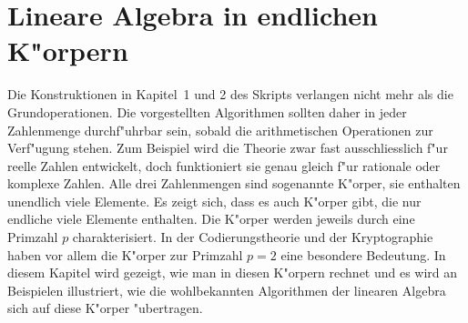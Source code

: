 %
%
%
\chapter{Lineare Algebra in endlichen K"orpern
\label{chapter:endlichekoerper}}

Die Konstruktionen in Kapitel~1 und 2 des Skripts verlangen nicht mehr
als die Grundoperationen.
Die vorgestellten Algorithmen sollten daher in jeder Zahlenmenge
durchf"uhrbar sein, sobald die arithmetischen Operationen zur
Verf"ugung stehen.
Zum Beispiel wird die Theorie zwar fast ausschliesslich f"ur reelle
Zahlen entwickelt, doch funktioniert sie genau gleich f"ur rationale
oder komplexe Zahlen.
Alle drei Zahlenmengen sind sogenannte K"orper, sie enthalten
unendlich viele Elemente.
Es zeigt sich, dass es auch K"orper gibt, die nur endliche viele
Elemente enthalten.
Die K"orper werden jeweils durch eine Primzahl $p$ charakterisiert.
In der Codierungstheorie und der Kryptographie haben vor allem die
K"orper zur Primzahl $p=2$ eine besondere Bedeutung.
In diesem Kapitel wird gezeigt, wie man in diesen K"orpern rechnet
und es wird an Beispielen illustriert, wie die wohlbekannten Algorithmen
der linearen Algebra sich auf diese K"orper "ubertragen.






